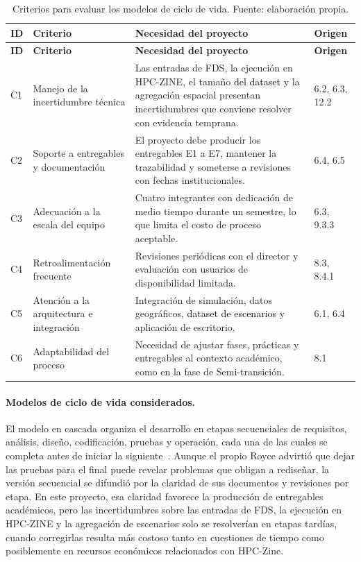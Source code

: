 \begin{longtable}{|p{}|p{}|p{}|p{}|}
\caption{Criterios para evaluar los modelos de ciclo de vida. Fuente: elaboración propia.}\label{tab:criterios-ciclo}\\
\hline
\textbf{ID} & \textbf{Criterio} & \textbf{Necesidad del proyecto} & \textbf{Origen}\\\hline
\endfirsthead
\hline
\textbf{ID} & \textbf{Criterio} & \textbf{Necesidad del proyecto} & \textbf{Origen}\\\hline
\endhead
C1 & Manejo de la incertidumbre técnica & Las entradas de FDS, la ejecución en HPC-ZINE, el tamaño \textcolor{black}{del dataset} y la agregación espacial presentan incertidumbres que conviene resolver con evidencia temprana. & 6.2, 6.3, 12.2\\\hline
C2 & Soporte a entregables y documentación & El proyecto debe producir los entregables E1 a E7, mantener la trazabilidad y someterse a revisiones con fechas institucionales. & 6.4, 6.5\\\hline
C3 & Adecuación a la escala del equipo & Cuatro integrantes con dedicación de medio tiempo durante un semestre, lo que limita el costo de proceso aceptable. & 6.3, 9.3.3\\\hline
C4 & Retroalimentación frecuente & Revisiones periódicas con el director y evaluación con usuarios de disponibilidad limitada. & 8.3, 8.4.1\\\hline
C5 & Atención a la arquitectura e integración & Integración de simulación, datos geográficos, \textcolor{black}{dataset de escenarios} y aplicación de escritorio. & 6.1, 6.4\\\hline
C6 & Adaptabilidad del proceso & Necesidad de ajustar fases, prácticas y entregables al contexto académico, como en la fase de Semi-transición. & 8.1\\\hline
\end{longtable}

\paragraph{Modelos de ciclo de vida considerados.}
El modelo en cascada organiza el desarrollo en etapas secuenciales de requisitos, análisis, diseño, codificación, pruebas y operación, cada una de las cuales se completa antes de iniciar la siguiente~\cite{royce1970}. Aunque el propio Royce advirtió que dejar las pruebas para el final puede revelar problemas que obligan a rediseñar, la versión secuencial se difundió por la claridad de sus documentos y revisiones por etapa. En este proyecto, esa claridad favorece la producción de entregables académicos, pero las incertidumbres sobre las entradas de FDS, la ejecución en HPC-ZINE y la agregación de escenarios solo se resolverían en etapas tardías, cuando corregirlas resulta más costoso tanto en cuestiones de tiempo como posiblemente en recursos económicos relacionados con HPC-Zine.

